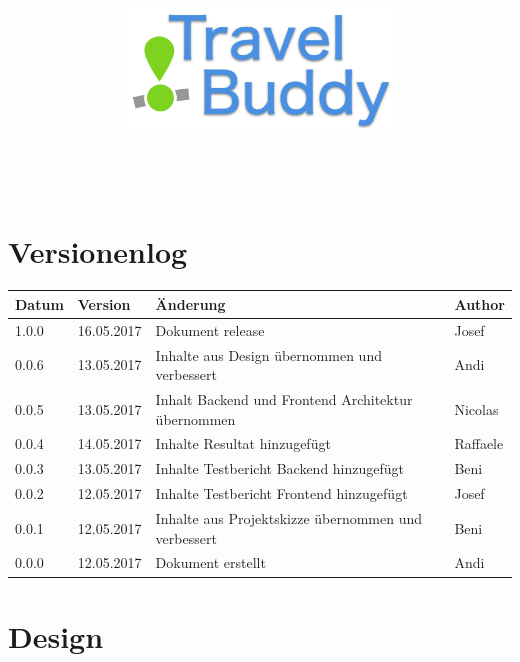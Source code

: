 \documentclass[a4paper,10pt,xetex]{article}
\title{
  \includegraphics[width=7cm]{travel-buddy_white}\\[\bigskipamount]
  \documenttitle\\[\bigskipamount]
}
\author{\documentauthors}
\date{\parbox{\linewidth}{\centering%
  IT15TA ZH \hspace*{3cm} Gruppe 3\endgraf\bigskip
  Dokumentversion \documentversion, \documentdate\endgraf
}}
\begin{document}

\maketitle\newpage

{
\hypersetup{linkcolor=black}
\setcounter{tocdepth}{4}
\tableofcontents
}

\newpage

\section{Versionenlog}\label{versionenlog}

\tabulinesep=1.2mm

\begin{longtabu} to \textwidth { | l | l | X[l] | l | }
  \hline
  \textbf{Datum} & \textbf{Version} & \textbf{Änderung} & \textbf{Author} \\
  \hline
  \endhead

  1.0.0 & 16.05.2017 & Dokument release & Josef\\
  \hline

  0.0.6 & 13.05.2017 & Inhalte aus Design übernommen und verbessert & Andi\\
  \hline

  0.0.5 & 13.05.2017 & Inhalt Backend und Frontend Architektur übernommen & Nicolas\\
  \hline

  0.0.4 & 14.05.2017 & Inhalte Resultat hinzugefügt & Raffaele\\
  \hline

  0.0.3 & 13.05.2017 & Inhalte Testbericht Backend hinzugefügt & Beni\\
  \hline

  0.0.2 & 12.05.2017 & Inhalte Testbericht Frontend hinzugefügt & Josef\\
  \hline

  0.0.1 & 12.05.2017 & Inhalte aus Projektskizze übernommen und verbessert & Beni\\
  \hline

  0.0.0 & 12.05.2017 & Dokument erstellt & Andi\\
  \hline
\end{longtabu}
\newpage





\section{Design}


\end{document}

